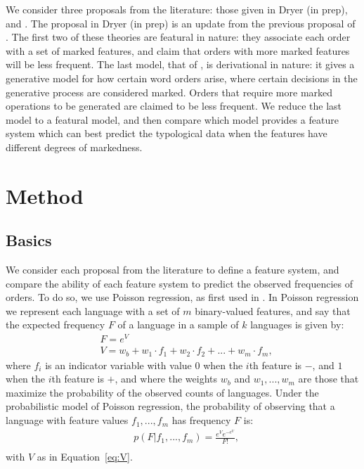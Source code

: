\documentclass[11pt]{article}
\begin{document}
We consider three proposals from the literature: those given in Dryer (in prep), \citet{cysouw2010dealing} and \citet{cinque2005deriving}.
The proposal in Dryer (in prep) is an update from the previous proposal of \citet{dryer2006cinque}.
The first two of these theories are featural in nature: they associate each order with a set of marked features, and claim that orders with more marked features will be less frequent.
The last model, that of \citet{cinque2005deriving}, is derivational in nature: it gives a generative model for how certain word orders arise, where certain decisions in the generative process are considered marked. Orders that require more marked operations to be generated are claimed to be less frequent.
We reduce the last model to a featural model, and then compare which model provides a feature system which can best predict the typological data when the features have different degrees of markedness.

\section{Method}

\subsection{Basics}
We consider each proposal from the literature to define a feature system, and compare the ability of each feature system to predict the observed frequencies of orders.
To do so, we use Poisson regression, as first used in \citet{cysouw2010dealing}.
In Poisson regression we represent each language with a set of $m$ binary-valued features, and say that the expected frequency $F$ of a language in a sample of $k$ languages is given by:
\begin{align}
  \nonumber
  &F = e^V \\
  \label{eq:V}
  &V = w_b + w_1 \cdot f_1 + w_2 \cdot f_2 + ... + w_m \cdot f_m,
\end{align}
where $f_i$ is an indicator variable with value $0$ when the $i$th feature is $-$, and $1$ when the $i$th feature is $+$, and where the weights $w_b$ and $w_1, ..., w_m$ are those that maximize the probability of the observed counts of languages.
Under the probabilistic model of Poisson regression, the probability of observing that a language with feature values $f_1, ..., f_m$ has frequency $F$ is:
\begin{align}
  \label{eq:p}
  &p(F|f_1, ..., f_m) = \frac{e^{V} e^{-e^{V}}}{F!}, \\
\end{align}
with $V$ as in Equation~\ref{eq:V}.
\end{document}
